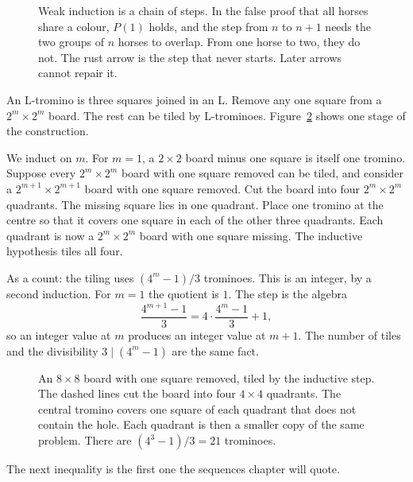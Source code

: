\begin{figure}[ht]
\centering
{}
\caption{Weak induction is a chain of steps. In the false proof that all horses share a colour, $P(1)$ holds, and the step from $n$ to $n+1$ needs the two groups of $n$ horses to overlap. From one horse to two, they do not. The rust arrow is the step that never starts. Later arrows cannot repair it.}
\label{fig:chain}
\end{figure}

\begin{examplex}
An L-tromino is three squares joined in an L. Remove any one square from a $2^m\times2^m$ board. The rest can be tiled by L-trominoes. Figure~\ref{fig:tromino} shows one stage of the construction.

We induct on $m$. For $m=1$, a $2\times2$ board minus one square is itself one tromino. Suppose every $2^m\times2^m$ board with one square removed can be tiled, and consider a $2^{m+1}\times2^{m+1}$ board with one square removed. Cut the board into four $2^m\times2^m$ quadrants. The missing square lies in one quadrant. Place one tromino at the centre so that it covers one square in each of the other three quadrants. Each quadrant is now a $2^m\times2^m$ board with one square missing. The inductive hypothesis tiles all four.

As a count: the tiling uses $(4^m-1)/3$ trominoes. This is an integer, by a second induction. For $m=1$ the quotient is $1$. The step is the algebra
\[
\frac{4^{m+1}-1}{3}=4\cdot\frac{4^m-1}{3}+1,
\]
so an integer value at $m$ produces an integer value at $m+1$. The number of tiles and the divisibility $3\mid(4^m-1)$ are the same fact.
\end{examplex}

\begin{figure}[ht]
\centering
{}
\caption{An $8\times8$ board with one square removed, tiled by the inductive step. The dashed lines cut the board into four $4\times4$ quadrants. The central tromino covers one square of each quadrant that does not contain the hole. Each quadrant is then a smaller copy of the same problem. There are $(4^3-1)/3=21$ trominoes.}
\label{fig:tromino}
\end{figure}

The next inequality is the first one the sequences chapter will quote.


